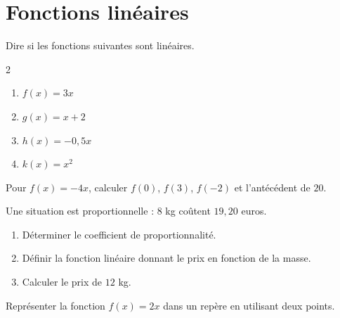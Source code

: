 \documentclass[a4paper,10pt]{report}
\begin{document}
\pagestyle{empty}
\section*{Fonctions linéaires}

\begin{ex}
Dire si les fonctions suivantes sont linéaires.
\begin{multicols}{2}
\begin{enumerate}
\item $f(x)=3x$
\item $g(x)=x+2$
\item $h(x)=-0,5x$
\item $k(x)=x^2$
\end{enumerate}
\end{multicols}
\end{ex}

\begin{ex}
Pour $f(x)=-4x$, calculer $f(0)$, $f(3)$, $f(-2)$ et l'antécédent de $20$.
\end{ex}

\begin{ex}
Une situation est proportionnelle : $8$ kg coûtent $19,20$ euros.
\begin{enumerate}
\item Déterminer le coefficient de proportionnalité.
\item Définir la fonction linéaire donnant le prix en fonction de la masse.
\item Calculer le prix de $12$ kg.
\end{enumerate}
\end{ex}

\begin{ex}
Représenter la fonction $f(x)=2x$ dans un repère en utilisant deux points.

\noindent\grandscarreaux{\linewidth}{6cm}
\end{ex}
\end{document}
